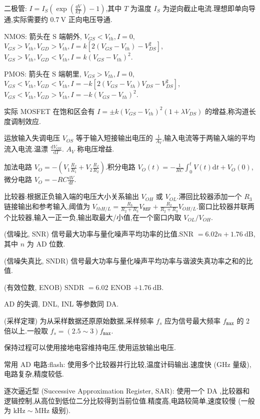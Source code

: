 二极管: $I=I_{S}\left( \exp\left( \frac{qV}{kT} \right) -1 \right) $,其中 $T$ 为温度 $I_{S}$ 为逆向截止电流.理想即单向导通,实际需要约 $0.7 \ \mathrm{V}$ 正向电压导通.

NMOS: 箭头在 S 端朝外, $V_{GS}<V_{th},I=0$,$V_{GS}>V_{th},V_{GD}>V_{th},I=k\left[2\left( V_{GS}-V_{th} \right) -V_{DS}^2\right]$,$V_{GS}>V_{th},V_{GD}<V_{th},I=k\left( V_{GS}-V_{th} \right) ^2$.

PMOS: 箭头在 S 端朝里, $V_{GS}>V_{th},I=0$,$V_{GS}<V_{th},V_{GD}<V_{th},I=-k\left[2\left( V_{GS}-V_{th} \right)V_{DS}-V_{DS}^2 \right]$,$V_{GS}<V_{th},V_{GD}>V_{th},I=-k\left( V_{GS}-V_{th} \right) ^2$.

实际 MOSFET 在饱和区会有 $I=\pm k\left( V_{GS}-V_{th} \right) ^2\left( 1+\lambda V_{DS} \right) $ 的增益,称沟道长度调制效应.

运放输入失调电压 $V_{OS}$ 等于输入短接输出电压的 $\frac{1}{A_{V}}$,输入电流等于两输入端的平均流入电流.温漂 $\frac{\mathrm{d}V_{OS}}{\mathrm{d}T}$. $A_{V}$ 称电压增益.

加法电路 $V_{O}=-\left( V_1 \frac{R_{f}}{R_1}+V_2 \frac{R_{f}}{R_2} \right) $.积分电路  $V_{O}\left( t \right) =-\frac{1}{RC}\int_{0}^{t}V\left( t \right) \mathrm{d}t+V_{O}\left( 0 \right) $,微分电路 $V_{O}=-RC \frac{\mathrm{d}V}{\mathrm{d}t}$.

比较器:根据正负输入端的电压大小关系输出 $V_{OH}$ 或 $V_{OL}$.滞回比较器添加一个 $R_3$ 链接输出和参考输入,阈值为 $V_{thH / L}=\frac{R_3}{R_2+R_3}V_{\texttt{REF}}+\frac{R_2}{R_2+R_3}V_{OH / L}$.窗口比较器并联两个比较器,输入一正一负,输出取最大/小值,在一个窗口内取 $V_{OL}/V_{OH}$.

(信噪比, SNR) 信号最大功率与量化噪声平均功率的比值.SNR $=6.02n+1.76 \ \mathrm{dB}$,其中 $n$ 为 AD 位数.

(信噪失真比, SNDR) 信号最大功率与量化噪声平均功率与谐波失真功率之和的比值.

(有效位数, ENOB) SNDR $=6.02$ ENOB $+1.76 \ \mathrm{dB}$.

AD 的失调, DNL, INL 等参数同 DA.

(采样定理) 为从采样数据还原原始数据,采样频率 $f_{s}$ 应为信号最大频率 $f_{\texttt{max}}$ 的 2 倍以上.一般取 $f_{s}=\left( 2.5\sim{}3 \right) f_{\texttt{max}}$.

保持过程可以使用接地电容维持电压,使用运放输出电压.

常用 AD 电路:flash: 使用多个比较器并行比较,温度计码输出.速度快 ($\mathrm{GHz}$ 量级),电路复杂,精度较低.

逐次逼近型 (Successive Approximation Register, SAR): 使用一个 DA ,比较器和逻辑控制,从高位到低位二分比较得到当前位值.精度高,电路较简单,速度较慢 (一般为 $\mathrm{kHz}\sim{}\mathrm{MHz}$ 级别).

